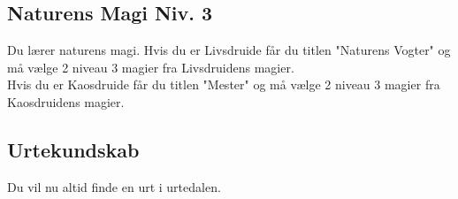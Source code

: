 \subsection*{Naturens Magi Niv. 3}
Du lærer naturens magi. Hvis du er Livsdruide får du titlen "Naturens Vogter" og må vælge 2 niveau 3 magier fra Livsdruidens magier.\\ Hvis du er Kaosdruide får du titlen "Mester" og må vælge 2 niveau 3 magier fra Kaosdruidens magier.\\

\subsection*{Urtekundskab}
Du vil nu altid finde en urt i urtedalen.